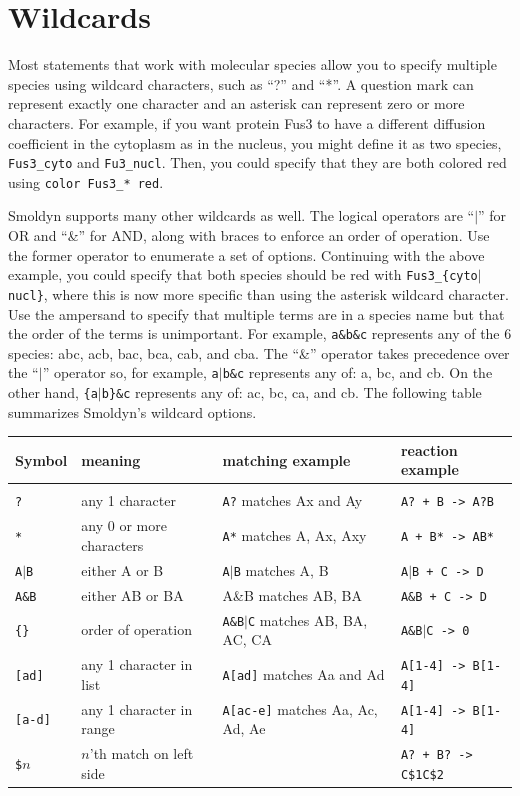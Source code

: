 \documentclass {scrbook}
\newcommand {\ttt} {\texttt}
\begin{document}
\section{Wildcards}

Most statements that work with molecular species allow you to specify multiple species using wildcard characters, such as ``?'' and ``*''. A question mark can represent exactly one character and an asterisk can represent zero or more characters. For example, if you want protein Fus3 to have a different diffusion coefficient in the cytoplasm as in the nucleus, you might define it as two species, \ttt{Fus3\_cyto} and \ttt{Fu3\_nucl}. Then, you could specify that they are both colored red using \ttt{color Fus3\_* red}.

Smoldyn supports many other wildcards as well. The logical operators are ``$|$'' for OR and ``\&'' for AND, along with braces to enforce an order of operation. Use the former operator to enumerate a set of options. Continuing with the above example, you could specify that both species should be red with \ttt{Fus3\_\{cyto$|$nucl\}}, where this is now more specific than using the asterisk wildcard character. Use the ampersand to specify that multiple terms are in a species name but that the order of the terms is unimportant. For example, \ttt{a\&b\&c} represents any of the 6 species: abc, acb, bac, bca, cab, and cba. The ``\&'' operator takes precedence over the ``$|$'' operator so, for example, \ttt{a$|$b\&c} represents any of: a, bc, and cb. On the other hand, \ttt{\{a$|$b\}\&c} represents any of: ac, bc, ca, and cb. The following table summarizes Smoldyn's wildcard options.

\begin{longtable}[c]{llll}
Symbol & meaning & matching example & reaction example\\
\hline \\
\ttt{?} & any 1 character & \ttt{A?} matches Ax and Ay & \ttt{A? + B -> A?B}\\
\ttt{*} & any 0 or more characters & \ttt{A*} matches A, Ax, Axy & \ttt{A + B* -> AB*}\\
\ttt{A$|$B} & either A or B & \ttt{A$|$B} matches A, B & \ttt{A$|$B + C -> D}\\
\ttt{A\&B} & either AB or BA & A\&B matches AB, BA & \ttt{A\&B + C -> D}\\
\ttt{\{\}} & order of operation & \ttt{A\&{B$|$C}} matches AB, BA, AC, CA & \ttt{A\&{B$|$C} -> 0}\\
\ttt{[ad]} & any 1 character in list & \ttt{A[ad]} matches Aa and Ad & \ttt{A[1-4] -> B[1-4]}\\
\ttt{[a-d]} & any 1 character in range & \ttt{A[ac-e]} matches Aa, Ac, Ad, Ae & \ttt{A[1-4] -> B[1-4]}\\
\ttt{\$}$n$ & $n$'th match on left side &  & \ttt{A? + B? -> C\$1C\$2}
\end{longtable}
\end{document}
